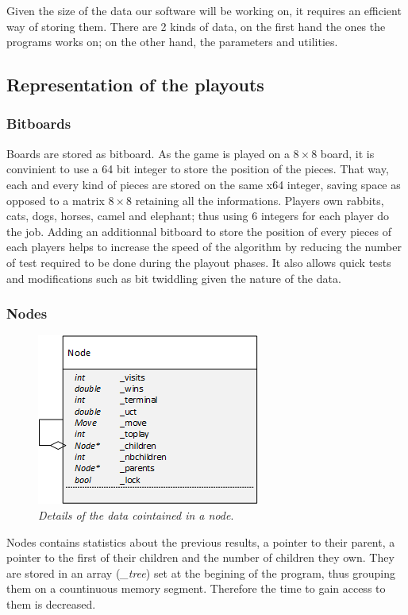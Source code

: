 Given the size of the data our software will be working on, it requires an efficient way of storing them. There are 2 kinds of data, on the first hand the ones the programs works on; on the other hand, the parameters and utilities.
\subsection{Representation of the playouts}
\subsubsection{Bitboards}
Boards are stored as bitboard. As the game is played on a \ensuremath{8\times8} board, it is convinient to use a 64 bit integer to store the position of the pieces. That way, each and every kind of pieces are stored on the same x64 integer, saving space as opposed to a matrix \ensuremath{8\times8} retaining all the informations. Players own rabbits, cats, dogs, horses, camel and elephant; thus using 6 integers for each player do the job. Adding an additionnal bitboard to store the position of every pieces of each players helps to increase the speed of the algorithm by reducing the number of test required to be done during the playout phases. It also allows quick tests and modifications such as bit twiddling given the nature of the data.

\subsubsection{Nodes}
\begin{figure}[H] 
\centerline{\includegraphics[scale=0.8]{Data_Structure/Img/Node.png}}
\caption{\label{fig:nodedetails}\textit{Details of the data cointained in a node}.}
\end{figure}
Nodes contains statistics about the previous results, a pointer to their parent, a pointer to the first of their children and the number of children they own. They are stored in an array (\textit{\_tree}) set at the begining of the program, thus grouping them on a countinuous memory segment. Therefore the time to gain access to them is decreased.

